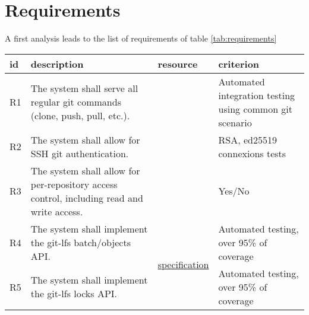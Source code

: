 \newpage
\section{Requirements}

A first analysis leads to the list of requirements of table \ref{tab:requirements}

\begin{table}[h]
    \begin{tabular}{|p{}|p{}|p{}|p{}|}
        \hline
        id  & description                                                                                                          & resource                                                                                                 & criterion                                                   \\ \hline
        R1  & The system shall serve all regular git commands (clone, push, pull, etc.).                                           &                                                                                                          & Automated integration testing using common git scenario     \\ \hline
        R2  & The system shall allow for SSH git authentication.                                                                   &                                                                                                          & RSA, ed25519 connexions tests                               \\ \hline
        R3  & The system shall allow for per-repository access control, including read and write access.                           &                                                                                                          & Yes/No                                                      \\ \hline
        R4  & The system shall implement the git-lfs batch/objects API.                                                            & \multirow{2}{*}{\href{https://github.com/git-lfs/git-lfs/blob/main/docs/api/}{specification}} & Automated testing, over 95\% of coverage                    \\ \cline{1-2} \cline{4-4}
        R5  & The system shall implement the git-lfs locks API.                                                                    &                                                                                                          & Automated testing, over 95\% of coverage                    \\ \hline

\end{tabular}
\end{table}
